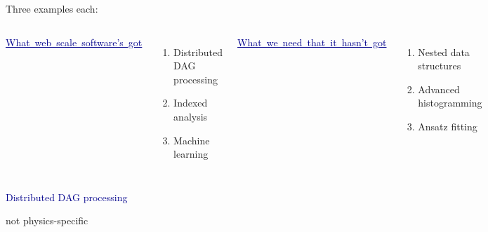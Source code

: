\documentclass[aspectratio=169]{beamer}
\begin{document}
\begin{frame}{Three examples each:}
\Large
\vspace{-0.5 cm}
\begin{columns}[t]
\mbox{\hspace{0.25 cm}\textcolor{darkblue}{\underline{What web scale software's got}}}

\vspace{0.25 cm}
\begin{enumerate}
\item Distributed DAG processing
\item Indexed analysis
\item Machine learning
\end{enumerate}

\mbox{\hspace{0.45 cm}\textcolor{darkblue}{\underline{What we need that it hasn't got}}}

\vspace{0.25 cm}
\begin{enumerate}
\item Nested data structures
\item Advanced histogramming
\item Ansatz fitting
\end{enumerate}

\end{columns}
\end{frame}

\begin{frame}{}
\huge
\vspace{0.5 cm}
\begin{center}
\textcolor{darkblue}{Distributed DAG processing}

\large
\vspace{0.5 cm}
not physics-specific
\end{center}
\end{frame}
\end{document}
